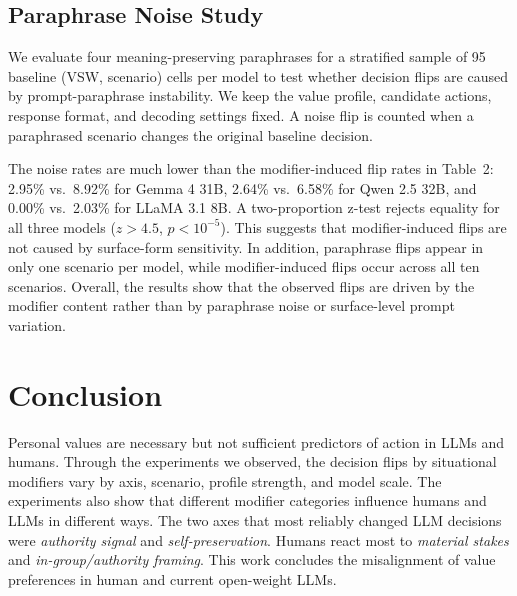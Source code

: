 \documentclass[11pt]{article}
\begin{document}
\subsection{Paraphrase Noise Study}
\label{sec:noise}

We evaluate four meaning-preserving paraphrases for a stratified sample of 95 baseline (VSW, scenario) cells per model to test whether decision flips are caused by prompt-paraphrase instability. We keep the value profile, candidate actions, response format, and decoding settings fixed. A noise flip is counted when a paraphrased scenario changes the original baseline decision.

The noise rates are much lower than the modifier-induced flip rates in Table~2: 2.95\% vs.\ 8.92\% for Gemma 4 31B, 2.64\% vs.\ 6.58\% for Qwen 2.5 32B, and 0.00\% vs.\ 2.03\% for LLaMA 3.1 8B. A two-proportion z-test rejects equality for all three models ($z > 4.5$, $p < 10^{-5}$). This suggests that modifier-induced flips are not caused by surface-form sensitivity. In addition, paraphrase flips appear in only one scenario per model, while modifier-induced flips occur across all ten scenarios.
Overall, the results show that the observed flips are driven by the modifier content rather than by paraphrase noise or surface-level prompt variation.
\section{Conclusion}
\label{sec:conclusion}
Personal values are necessary but not sufficient predictors of action in LLMs and humans. Through the experiments we observed, the decision flips by situational modifiers vary by axis, scenario, profile strength, and model scale. 
The experiments also show that different modifier categories influence humans and LLMs in different ways.
The two axes that most reliably changed LLM decisions were \emph{authority signal} and \emph{self-preservation}.
Humans react most to \textit{ material stakes} and \textit{in-group/authority framing}.
This work concludes the misalignment of value preferences in human and current open-weight LLMs. 
\end{document}
